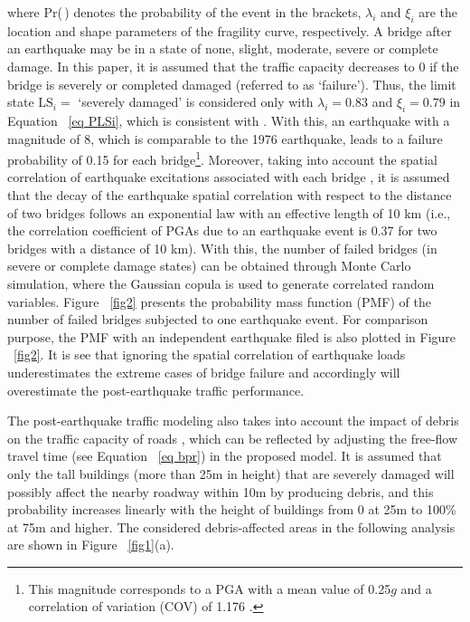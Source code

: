 \documentclass[review,11pt,nonatbib]{elsarticle}
\begin{document}
where Pr(\,) denotes the probability of the event in the brackets, $\lambda_i$ and $\xi_i$ are the location and shape parameters of the fragility curve, respectively. A bridge after an earthquake may be in a state of none, slight, moderate, severe or complete damage. In this paper, it is assumed that the traffic capacity decreases to 0 if the bridge is severely or completed damaged (referred to as `failure'). Thus, the limit state $\mathrm{LS}_i=$ `severely damaged' is considered only with $\lambda_i=0.83$ and $\xi_i=0.79$ in Equation ~\eqref{eq PLSi}, which is consistent with \citep{Wu2014Calibration}. With this, an earthquake with a magnitude of 8, which is comparable to the 1976 earthquake, leads to a failure probability of 0.15 for each bridge\footnote{This magnitude corresponds to a PGA with a mean value of 0.25$g$ \citep{gb50011code} and a correlation of variation (COV) of 1.176 \citep{gao1985probabilistic}.}. Moreover, taking into account the spatial correlation of earthquake excitations associated with each bridge \citep{wang2005macrospatial,jayaram2009correlation}, it is assumed that the decay of the earthquake spatial correlation with respect to the distance of two bridges follows an exponential law with an effective length of 10 km (i.e., the correlation coefficient of PGAs due to an earthquake event is 0.37 for two bridges with a distance of 10 km). With this, the number of failed bridges (in severe or complete damage states) can be obtained through Monte Carlo simulation, where the Gaussian copula \citep{nelsen1999introduction} is used to generate correlated random variables. Figure ~\ref{fig2} presents the probability mass function (PMF) of the number of failed bridges subjected to one earthquake event. For comparison purpose, the PMF with an independent earthquake filed is also plotted in Figure ~\ref{fig2}. It is see that ignoring the spatial correlation of earthquake loads underestimates the extreme cases of bridge failure and accordingly will overestimate the post-earthquake traffic performance.
\par The post-earthquake traffic modeling also takes into account the impact of debris on the traffic capacity of roads \citep{roess2011traffic}, which can be reflected by adjusting the free-flow travel time (see Equation ~\eqref{eq bpr}) in the proposed model. It is assumed that only the tall buildings (more than 25m in height) that are severely damaged will possibly affect the nearby roadway within 10m by producing debris, and this probability increases linearly with the height of buildings from 0 at 25m to 100\% at 75m and higher. The considered debris-affected areas in the following analysis are shown in Figure ~\ref{fig1}(a).
\end{document}
